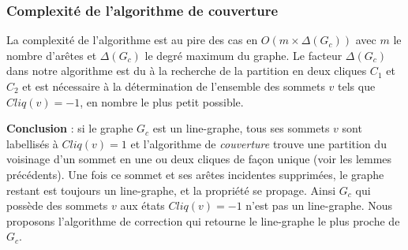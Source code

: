 \subsubsection{Complexit\'e de l'algorithme de couverture}
La complexit\'e de l'algorithme est au pire des cas en $O(m \times \Delta(G_c))$ avec $m$ le nombre d'ar\^etes et $\Delta(G_c)$ le degr\'e maximum du graphe.
Le facteur $\Delta(G_c)$ dans notre algorithme est du \`a la recherche de la partition en deux cliques $C_1$ et $C_2$ et est n\'ecessaire \`a la d\'etermination de l'ensemble des sommets $v$ tels que $Cliq(v) = -1$, en nombre le plus petit possible.
\newline

{\bf Conclusion} : si le graphe $G_c$ est un line-graphe, tous ses sommets $v$ sont labellis\'es \`a $Cliq(v) = 1$ et l'algorithme  de {\em couverture} trouve une partition du voisinage d'un sommet en une ou deux cliques de fa\c con unique (voir les lemmes pr\'ec\'edents). 
Une fois ce sommet et ses ar\^etes incidentes supprim\'ees, le graphe restant est toujours un line-graphe, et la propri\'et\'e se propage.
Ainsi $G_c$ qui poss\`ede des sommets $v$ aux \'etats $Cliq(v) = -1$ n'est pas un line-graphe. Nous proposons l'algorithme de correction qui retourne le line-graphe le plus proche de $G_c$.


